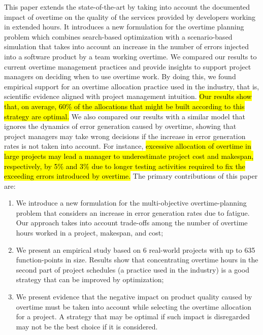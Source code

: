 \documentclass[conference]{IEEEtran}
\begin{document}
This paper extends the state-of-the-art by taking into account the documented impact of overtime on the quality of the services provided by developers working in extended hours. It introduces a new formulation for the overtime planning problem which combines search-based optimization with a scenario-based simulation that takes into account an increase in the number of errors injected into a software product by a team working overtime. We compared our results to current overtime management practices and provide insights to support project managers on deciding when to use overtime work. By doing this, we found empirical support for an overtime allocation practice used in the industry, that is, scientific evidence aligned with project management intuition. \hl{Our results show that, on average, 60\% of the allocations that might be built according to this strategy are optimal.} We also compared our results with a similar model that ignores the dynamics of error generation caused by overtime,  showing that project managers may take wrong decisions if the increase in error generation rates is not taken into account. For instance, \hl{excessive allocation of overtime in large projects may lead a manager to underestimate project cost and makespan, respectively, by 5\% and 3\% due to longer testing activities required to fix the exceeding errors introduced by overtime.} The primary contributions of this paper are:

\begin{enumerate}
\item We introduce a new formulation for the multi-objective overtime-planning problem that considers an increase in error generation rates due to fatigue. Our approach takes into account trade-offs among the number of overtime hours worked in a project, makespan, and cost;

\item We present an empirical study based on 6 real-world projects with up to 635 function-points in size. Results show that concentrating overtime hours in the second part of project schedules (a practice used in the industry) is a good strategy that can be improved by optimization;

\item We present evidence that the negative impact on product quality caused by overtime must be taken into account while selecting the overtime allocation for a project. A strategy that may be optimal if such impact is disregarded may not be the best choice if it is considered.
\end{enumerate}
\end{document}
